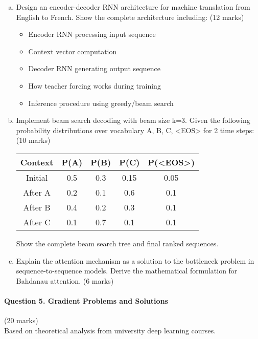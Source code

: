 \documentclass[12pt]{article}
\newcommand{\mediumanswer}{\vspace{3cm}}
\newcommand{\journalspace}{\vspace{4.5cm}}
\newcommand{\codespace}{\vspace{5cm}}
\begin{document}
\begin{enumerate}[(a)]
    \item Design an encoder-decoder RNN architecture for machine translation from English to French. Show the complete architecture including: \hfill (12 marks)
    \begin{itemize}
        \item Encoder RNN processing input sequence
        \item Context vector computation
        \item Decoder RNN generating output sequence
        \item How teacher forcing works during training
        \item Inference procedure using greedy/beam search
    \end{itemize}
    
    \journalspace
    
    \item Implement beam search decoding with beam size k=3. Given the following probability distributions over vocabulary {A, B, C, \textless EOS\textgreater} for 2 time steps: \hfill (10 marks)
    
    \begin{center}
    \begin{tabular}{|c|c|c|c|c|}
    \hline
    Context & P(A) & P(B) & P(C) & P(\textless EOS\textgreater) \\
    \hline
    Initial & 0.5 & 0.3 & 0.15 & 0.05 \\
    After A & 0.2 & 0.1 & 0.6 & 0.1 \\
    After B & 0.4 & 0.2 & 0.3 & 0.1 \\
    After C & 0.1 & 0.7 & 0.1 & 0.1 \\
    \hline
    \end{tabular}
    \end{center}
    
    Show the complete beam search tree and final ranked sequences.
    
    \codespace
    
    \item Explain the attention mechanism as a solution to the bottleneck problem in sequence-to-sequence models. Derive the mathematical formulation for Bahdanau attention. \hfill (6 marks)
    
    \mediumanswer
\end{enumerate}

\newpage
\paragraph{Question 5. Gradient Problems and Solutions}\hfill (20 marks)\\
Based on theoretical analysis from university deep learning courses.
\end{document}
